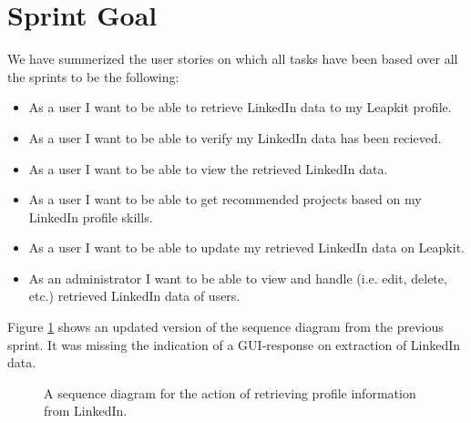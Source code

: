 \section{Sprint Goal}
We have summerized the user stories on which all tasks have been based over all the sprints to be the following:
\begin{itemize}
\item As a user I want to be able to retrieve LinkedIn data to my Leapkit profile.
\item As a user I want to be able to verify my LinkedIn data has been recieved.
\item As a user I want to be able to view the retrieved LinkedIn data.
\item As a user I want to be able to get recommended projects based on my LinkedIn profile skills.
\item As a user I want to be able to update my retrieved LinkedIn data on Leapkit.
\item As an administrator I want to be able to view and handle (i.e. edit, delete, etc.) retrieved LinkedIn data of users.
\end{itemize}


Figure \ref{fig:profilesequence} shows an updated version of the sequence diagram from the previous sprint. It was missing the indication of a GUI-response on extraction of LinkedIn data.

\begin{figure}[ht]
    \centering
    \scalebox{1}{}
    \caption{A sequence diagram for the action of retrieving profile information from LinkedIn.}
    \label{fig:profilesequence}
\end{figure}